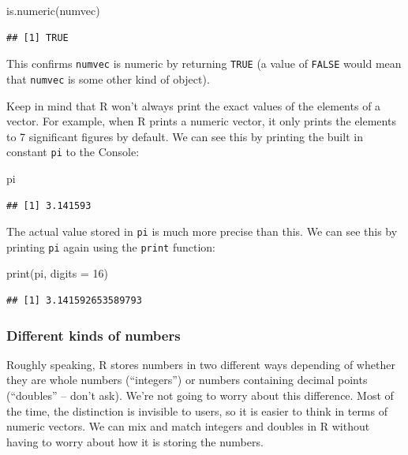\documentclass[
]{book}
\newenvironment{Shaded}{\begin{snugshade}}{\end{snugshade}}
\newcommand{\AttributeTok}[1]{\textcolor[rgb]{0.77,0.63,0.00}{#1}}
\newcommand{\DecValTok}[1]{\textcolor[rgb]{0.00,0.00,0.81}{#1}}
\newcommand{\FunctionTok}[1]{\textcolor[rgb]{0.00,0.00,0.00}{#1}}
\newcommand{\NormalTok}[1]{#1}
\newenvironment{greybox}{
  \definecolor{shadecolor}{rgb}{0.95,0.95,0.95}  %
  \color{black}
  \begin{shaded}}
 {\end{shaded}}
\newenvironment{infobox}[1]
  {
  \begin{itemize}
  \renewcommand{\labelitemi}{
    \raisebox{-.7\height}[0pt][0pt]{
      {\setkeys{Gin}{width=3em,keepaspectratio}
        \texttt{[image: images/\#1]}}
    }
  }
  \setlength{\fboxsep}{1em}
  \begin{greybox}
  \item
  }
  {
  \end{greybox}
  \end{itemize}
  }
\begin{document}
\begin{Shaded}
\begin{Highlighting}[]
\FunctionTok{is.numeric}\NormalTok{(numvec)}
\end{Highlighting}
\end{Shaded}

\begin{verbatim}
## [1] TRUE
\end{verbatim}

This confirms \texttt{numvec} is numeric by returning \texttt{TRUE} (a value of \texttt{FALSE} would mean that \texttt{numvec} is some other kind of object).

Keep in mind that R won't always print the exact values of the elements of a vector. For example, when R prints a numeric vector, it only prints the elements to 7 significant figures by default. We can see this by printing the built in constant \texttt{pi} to the Console:

\begin{Shaded}
\begin{Highlighting}[]
\NormalTok{pi}
\end{Highlighting}
\end{Shaded}

\begin{verbatim}
## [1] 3.141593
\end{verbatim}

The actual value stored in \texttt{pi} is much more precise than this. We can see this by printing \texttt{pi} again using the \texttt{print} function:

\begin{Shaded}
\begin{Highlighting}[]
\FunctionTok{print}\NormalTok{(pi, }\AttributeTok{digits =} \DecValTok{16}\NormalTok{)}
\end{Highlighting}
\end{Shaded}

\begin{verbatim}
## [1] 3.141592653589793
\end{verbatim}

\begin{infobox}{information}

\hypertarget{different-kinds-of-numbers}{%
\subsubsection*{Different kinds of numbers}\label{different-kinds-of-numbers}}

Roughly speaking, R stores numbers in two different ways depending of whether they are whole numbers (``integers'') or numbers containing decimal points (``doubles'' -- don't ask). We're not going to worry about this difference. Most of the time, the distinction is invisible to users, so it is easier to think in terms of numeric vectors. We can mix and match integers and doubles in R without having to worry about how it is storing the numbers.

\end{infobox}
\end{document}
